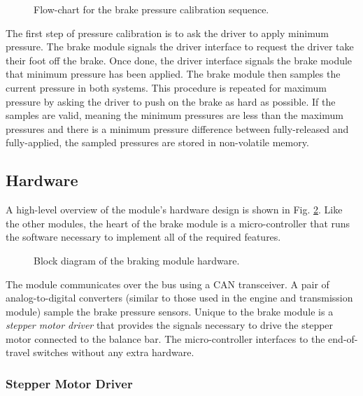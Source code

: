 \begin{figure}[H]
	\centering
	
	\caption{Flow-chart for the brake pressure calibration sequence.}
	\label{fig:brake_pressure_calibration_flow}
\end{figure}

The first step of pressure calibration is to ask the driver to apply minimum pressure. The brake module signals the driver interface to request the driver take their foot off the brake. Once done, the driver interface signals the brake module that minimum pressure has been applied. The brake module then samples the current pressure in both systems. This procedure is repeated for maximum pressure by asking the driver to push on the brake as hard as possible. If the samples are valid, meaning the minimum pressures are less than the maximum pressures and there is a minimum pressure difference between fully-released and fully-applied, the sampled pressures are stored in non-volatile memory.

\subsection{Hardware}

A high-level overview of the module's hardware design is shown in Fig. \ref{fig:brake_hardware_design_block}. Like the other modules, the heart of the brake module is a micro-controller that runs the software necessary to implement all of the required features. 

\begin{figure}[H]
\centering

\caption{Block diagram of the braking module hardware.}
\label{fig:brake_hardware_design_block}
\end{figure}

The module communicates over the bus using a CAN transceiver. A pair of analog-to-digital converters (similar to those used in the engine and transmission module) sample the brake pressure sensors. Unique to the brake module is a \emph{stepper motor driver} that provides the signals necessary to drive the stepper motor connected to the balance bar. The micro-controller interfaces to the end-of-travel switches without any extra hardware.

\subsubsection{Stepper Motor Driver}

